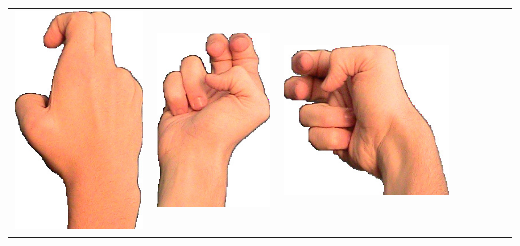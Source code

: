 \documentclass{article}
\begin{document}
\begin{center}
\begin{tabular}{r*{6}{c}}
\includegraphics[scale=0.1]{images/03-03-3.jpg}&
\includegraphics[scale=0.1]{images/03-03-4.jpg}&
\includegraphics[scale=0.1]{images/03-03-5.jpg}&

\end{tabular}
\end{center}
\end{document}
